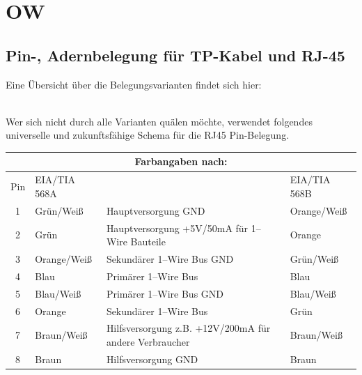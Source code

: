 \section{OW}
{
\subsection{Pin-, Adernbelegung für TP-Kabel und RJ-45}
}

Eine Übersicht über die Belegungsvarianten findet sich hier:

\\

Wer sich nicht durch alle Varianten quälen möchte, verwendet folgendes universelle
und zukunftsfähige Schema für die RJ45 Pin-Belegung. \\

\begin{center}
\begin{tabular}{|c|l|l|l|}
\hline
   \multicolumn{4}{|c|}{Farbangaben nach:} \\ \hline
Pin & EIA/TIA 568A &                                               & EIA/TIA 568B \\ \hline
1   & Grün/Weiß    & Hauptversorgung GND                           & Orange/Weiß  \\ \hline
2   & Grün         & Hauptversorgung +5V/50mA für 1--Wire Bauteile & Orange \\ \hline
3   & Orange/Weiß  & Sekundärer 1--Wire Bus GND                    & Grün/Weiß \\ \hline
4   & Blau         & Primärer 1--Wire Bus                          & Blau \\ \hline
5   & Blau/Weiß    & Primärer 1--Wire Bus GND                      & Blau/Weiß \\ \hline
6   & Orange       & Sekundärer 1--Wire Bus                        & Grün \\ \hline
7   & Braun/Weiß   & Hilfsversorgung z.B. +12V/200mA für andere Verbraucher
                                                                   & Braun/Weiß \\ \hline
8 & Braun        & Hilfsversorgung GND                             & Braun \\ \hline
\end{tabular}
\end{center}


